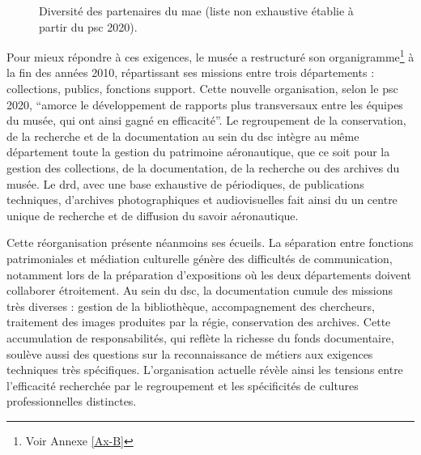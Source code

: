\begin{figure}[htbp]
	
	\caption{Diversité des partenaires du \ac{mae} (liste non exhaustive établie à partir du \ac{psc} 2020).}
	\label{fig:schem_partenaires}
\end{figure}

Pour mieux répondre à ces exigences, le musée a restructuré son organigramme\footnote{Voir Annexe \ref{Ax-B}} à la fin des années 2010, répartissant ses missions entre trois départements : collections, publics, fonctions support. Cette nouvelle organisation, selon le \ac{psc} 2020, \enquote{amorce le développement de rapports plus transversaux entre les équipes du musée, qui ont ainsi gagné en efficacité}. Le regroupement de la conservation, de la recherche et de la documentation au sein du \ac{dsc} intègre au même département toute la gestion du patrimoine aéronautique, que ce soit pour la gestion des collections, de la documentation, de la recherche  ou des archives du musée. Le \ac{drd}, avec une base exhaustive de périodiques, de publications techniques, d'archives photographiques et audiovisuelles fait ainsi du \mae un centre unique de recherche et de diffusion du savoir aéronautique.

Cette réorganisation présente néanmoins ses écueils. La séparation entre fonctions patrimoniales et médiation culturelle génère des difficultés de communication, notamment lors de la préparation d'expositions où les deux départements doivent collaborer étroitement. Au sein du \ac{dsc}, la documentation cumule des missions très diverses : gestion de la bibliothèque, accompagnement des chercheurs, traitement des images produites par la régie, conservation des archives. Cette accumulation de responsabilités, qui reflète la richesse du fonds documentaire, soulève aussi des questions sur la reconnaissance de métiers aux exigences techniques très spécifiques. L'organisation actuelle révèle ainsi les tensions entre l'efficacité recherchée par le regroupement et les spécificités de cultures professionnelles distinctes.